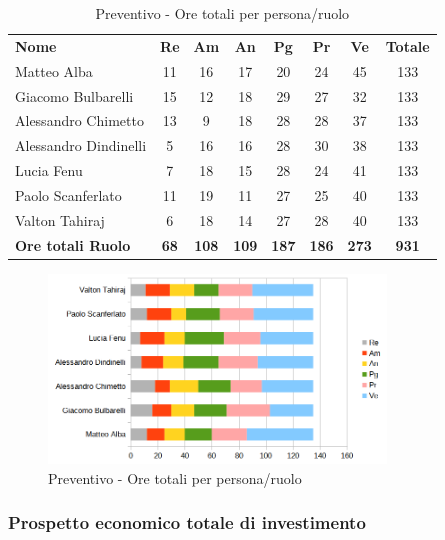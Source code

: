 		\begin{table} [h!]
			\begin{center}
				\begin{tabular} { m{3.5cm} c c c c c c c }
					\rowcolor{lightgray}
					\textbf{Nome} & \textbf{Re} & \textbf{Am} & \textbf{An} & \textbf{Pg} & \textbf{Pr} & \textbf{Ve} & \textbf{Totale} \\
					Matteo Alba & 11 & 16 & 17 & 20 & 24 & 45 & 133 \\
					Giacomo Bulbarelli & 15 & 12 & 18 & 29 & 27 & 32 & 133 \\
					Alessandro Chimetto & 13 & 9 & 18 & 28 & 28 & 37 & 133 \\
					Alessandro Dindinelli & 5 & 16 & 16 & 28 & 30 & 38 & 133 \\
					Lucia Fenu & 7 & 18 & 15 & 28 & 24 & 41 & 133 \\
					Paolo Scanferlato & 11 & 19 & 11 & 27 & 25 & 40 & 133 \\
					Valton Tahiraj & 6 & 18 & 14 & 27 & 28 & 40 & 133 \\
					\textbf{Ore totali Ruolo} & \textbf{68} & \textbf{108} & \textbf{109} & \textbf{187} & \textbf{186}& \textbf{273} & \textbf{931}
				\end{tabular}
				\caption{Preventivo - Ore totali per persona/ruolo}
			\end{center}
		\end{table}
	
		\begin{figure} [h!]
			\centering
			\includegraphics[width=0.8\textwidth]{res/img/preventivi/totNONrend-barre.png}
			\caption{Preventivo - Ore totali per persona/ruolo} 
		\end{figure}
	
	\newpage
	
	\subsubsection{Prospetto economico totale di investimento}
	
